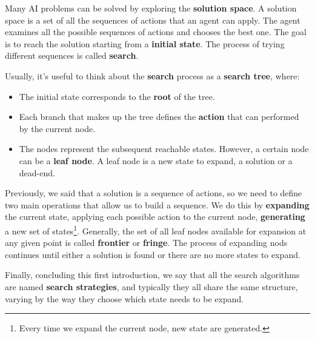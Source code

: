 Many AI problems can be solved by exploring the \textbf{solution space}. A solution space is a set of all the sequences of actions that an agent can apply. The agent examines all
the possible sequences of actions and chooses the best one. The goal is to reach the solution starting from a \textbf{initial state}. The process of trying different sequences
is called \textbf{search}. \vspace{3.5pt}

Usually, it's useful to think about the \textbf{search} process as a \textbf{search tree}, where:
\begin{itemize}
    \renewcommand{\labelitemi}{-}
    \item The initial state corresponds to the \textbf{root} of the tree.
    \item Each branch that makes up the tree defines the \textbf{action} that can performed by the current node.
    \item The nodes represent the subsequent reachable states. However, a certain node can be a \textbf{leaf node}. A leaf node is a new state to expand, a solution or a dead-end.
\end{itemize}
Previously, we said that a solution is a sequence of actions, so we need to define two main operations that allow us to build a sequence. We do this by \textbf{expanding}
the current state, applying each possible action to the current node, \textbf{generating} a new set of states\footnote{Every time we expand the current node, new state are generated.}.
Generally, the set of all leaf nodes available for expansion at any given point is called \textbf{frontier} or \textbf{fringe}. The process of expanding nods continues until
either a solution is found or there are no more states to expand. \vspace{3.5pt}

Finally, concluding this first introduction, we say that all the search algorithms are named \textbf{search strategies}, and typically they all share the same structure, varying
by the way they choose which state needs to be expand.